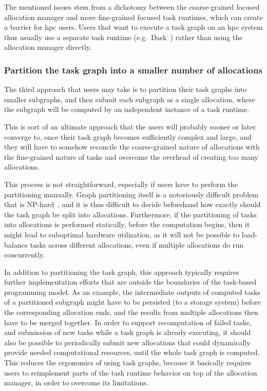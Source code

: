 The mentioned issues stem from a dichotomy between the coarse-grained focused allocation manager
and more fine-grained focused task runtimes, which can create a barrier for
\gls{hpc} users. Users that want to execute a task graph on an
\gls{hpc} system thus usually use a separate task runtime (e.g.\
Dask~\cite{dask}) rather than using the allocation manager directly.

\subsubsection*{Partition the task graph into a smaller number of allocations}
The third approach that users may take is to partition their task graphs into smaller subgraphs,
and then submit each subgraph as a single allocation, where the subgraph will be computed by an
independent instance of a task runtime.

This is sort of an ultimate approach that the users will probably sooner or later converge to, once
their task graph becomes sufficiently complex and large, and they will have to somehow reconcile
the coarse-grained nature of allocations with the fine-grained nature of tasks and overcome the
overhead of creating too many allocations.

This process is not straightforward, especially if users have to perform the partitioning manually.
Graph partitioning itself is a notoriously difficult problem that is
NP-hard~\cite{graph_partitioning}\todo[inline]{Ada: Is this OK?}, and it is thus difficult to decide
beforehand how exactly should the task graph be split into allocations. Furthermore, if the
partitioning of tasks into allocations is performed statically, before the computation begins, then
it might lead to suboptimal hardware utilization, as it will not be possible to load-balance tasks
across different allocations, even if multiple allocations do run concurrently.

In addition to partitioning the task graph, this approach typically requires further implementation
efforts that are outside the boundaries of the task-based programming model. As an example, the
intermediate outputs of computed tasks of a partitioned subgraph might have to be persisted (to a
storage system) before the corresponding allocation ends, and the results from multiple allocations
then have to be merged together. In order to support recomputation of failed tasks, and submission
of new tasks while a task graph is already executing, it should also be possible to periodically
submit new allocations that could dynamically provide needed computational resources, until the
whole task graph is computed. This reduces the ergonomics of using task graphs, because it
basically requires users to reimplement parts of the task runtime behavior on top of the allocation
manager, in order to overcome its limitations.

